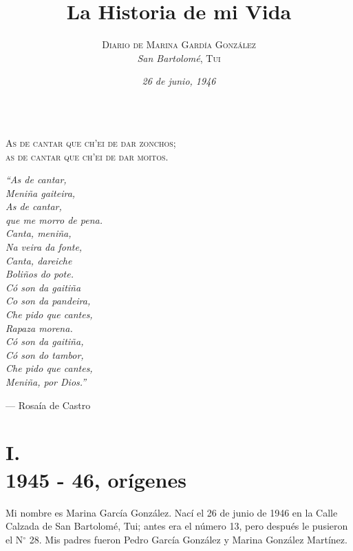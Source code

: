 \documentclass[12pt,a5paper]{book}
\title{\textbf{ \Huge La Historia de mi Vida}}
\author{\textsc{Diario de Marina Gardía González}\\ {\footnotesize \textit{San Bartolomé}, \textsc{Tui}}}
\date{\textit{26 de junio, 1946}}
\begin{document}
\maketitle


\[\]
\pagebreak



\begin{center}
\textsc{As de cantar que ch'ei de dar zonchos;}\\
\textsc{as de cantar que ch'ei de dar moitos.}
\end{center}

\begin{multicols}{2}
\textit{``As de cantar,}\\
\textit{Meniña gaiteira,}\\
\textit{As de cantar,}\\
\textit{que me morro de pena.}\\

\textit{Canta, meniña,}\\
\textit{Na veira da fonte,}\\
\textit{Canta, dareiche}\\
\textit{Boliños do pote.}\\

\textit{Có son da gaitiña}\\
\textit{Co son da pandeira,}\\
\textit{Che pido que cantes,}\\
\textit{Rapaza morena.}\\

\textit{Có son da gaitiña,}\\
\textit{Có son do tambor,}\\
\textit{Che pido que cantes,}\\
\textit{Meniña, por Dios.''}
\end{multicols}
\begin{flushright}
--- Rosaía de Castro
\end{flushright}



\pagebreak


\section*{I.\\1945 - 46, orígenes}

Mi nombre es Marina García González. Nací el 26 de junio de 1946 en la Calle Calzada de San Bartolomé, Tui; antes era el número 13, pero después le pusieron el N$^\circ$ 28. Mis padres fueron Pedro García González y Marina González Martínez. 
\end{document}
